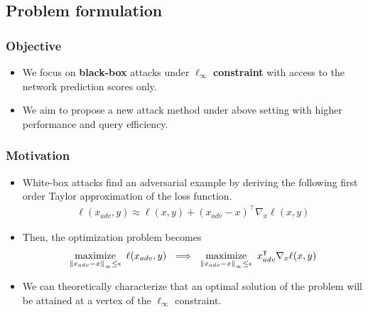 \documentclass[10pt,mathserif]{beamer}
\newcommand{\norm}[1]{\left\lVert#1\right\rVert}
\begin{document}
\subsection{Problem formulation}

\begin{frame}
    \frametitle{Objective}
    \begin{itemize}\itemsep=20pt
        \item We focus on \textbf{black-box} attacks under $\boldsymbol\ell_{\boldsymbol\infty}$ \textbf{constraint} with access to the network prediction scores only.\pause
        \item We aim to propose a new attack method under above setting with higher performance and query efficiency.
    \end{itemize}
    
\end{frame}


\begin{frame}
\frametitle{Motivation}
\begin{itemize}\itemsep=12pt
    \item White-box attacks find an adversarial example by deriving the following first order Taylor approximation of the loss function.
    \begin{align*}
        \ell(x_{adv}, y) \approx \ell(x, y) + (x_{adv}-x)^\intercal \nabla_{x}\ell(x, y)
    \end{align*}\pause
    \item Then, the optimization problem becomes
    \begin{align*}
        \maximize_{\norm{x_{adv}-x}_\infty \le \epsilon}~\ell(x_{adv}, y) ~\implies~ \maximize_{\norm{x_{adv}-x}_\infty \le \epsilon}~x_{adv}^\intercal \nabla_{x}\ell(x, y)
    \end{align*}\pause
    \item We can theoretically characterize that an optimal solution of the problem will be attained at a vertex of the $\ell_\infty$ constraint. 
\end{itemize}
\end{frame}
\end{document}
